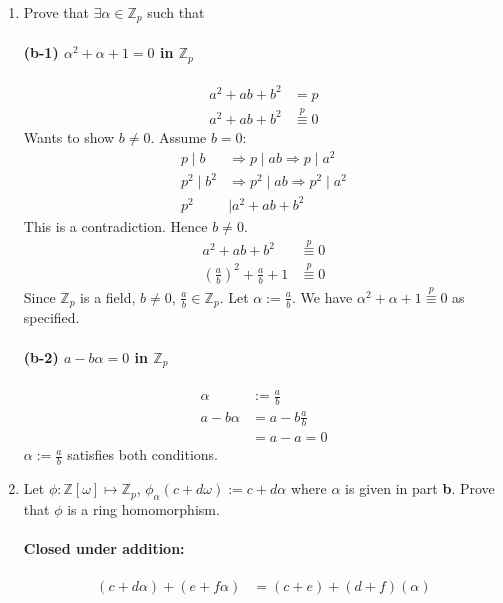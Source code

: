 \documentclass[12pt]{article}
\begin{document}
\begin{enumerate}
\begin{enumerate}
		\item Prove that $\exists \alpha \in \mathbb{Z}_p$ such that
			\paragraph{(b-1) $\alpha^2 + \alpha + 1 = 0$ in $\mathbb{Z}_p$}
				\begin{align*}
					a^2 + ab+b^2 &= p\\
					a^2 + ab+b^2 &\overset{p}{\equiv} 0
				\end{align*}
				Wants to show $b \neq 0$. Assume $b=0$:
				\begin{align*}
					p \mid b &\Rightarrow p \mid ab \Rightarrow p\mid a^2\\
					p^2 \mid b^2 &\Rightarrow p^2 \mid ab \Rightarrow p^2\mid a^2\\
					p^2 &\mid a^2 + ab+b^2
				\end{align*}
				This is a contradiction. Hence $b \neq 0$.
				\begin{align*}
					a^2 + ab+b^2 &\overset{p}{\equiv} 0\\
					\left(\frac{a}{b}\right)^2 + \frac{a}{b}+1 &\overset{p}{\equiv} 0
				\end{align*}
				Since $\mathbb{Z}_p$ is a field, $b \neq 0$, $\frac{a}{b} \in
				\mathbb{Z}_p$. Let $\alpha := \frac{a}{b}$. We have 
				$\alpha^2 + \alpha + 1 \overset{p}{\equiv} 0$ as specified.

			\paragraph{(b-2) $a - b\alpha = 0$ in $\mathbb{Z}_p$}
			\begin{align*}
				\alpha &:= \frac{a}{b}\\
				a - b\alpha &= a - b\frac{a}{b}\\
										&= a - a = 0
			\end{align*}
			$\alpha := \frac{a}{b}$ satisfies both conditions.

		\item Let $\phi:\mathbb{Z}[\omega] \mapsto \mathbb{Z}_p$, $\phi_\alpha(c+d\omega) :=
			c+d\alpha$ where $\alpha$ is given in part \textbf{b}. Prove that $\phi$
			is a ring homomorphism.
			\paragraph{Closed under addition:} 
			\begin{align*}
			(c+d\alpha) + (e+f\alpha) &= (c+e) + (d+f) (\alpha)\\
			\end{align*}

\end{enumerate}
\end{enumerate}
\end{document}
